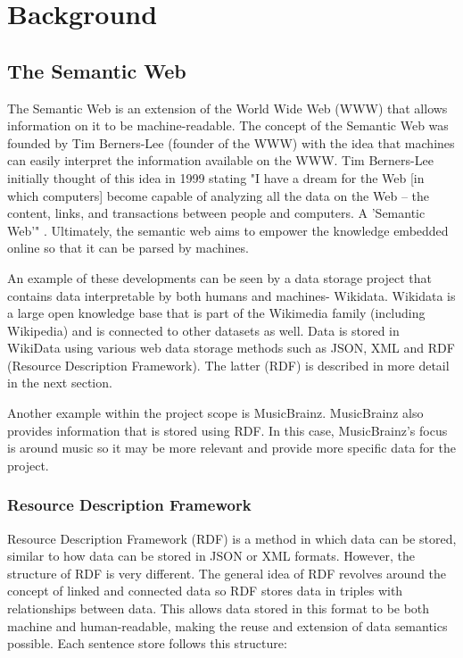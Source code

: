 \usetikzlibrary {arrows}
\usetikzlibrary {shapes.geometric}
\usetikzlibrary {patterns}

\chapter{Background}

\section{The Semantic Web}
\hspace*{0.5cm} The Semantic Web is an extension of the World Wide Web (WWW) that allows information on it to be machine-readable. \cite{semanticweb} The concept of the Semantic Web was founded by Tim Berners-Lee (founder of the WWW) with the idea that machines can easily interpret the information available on the WWW. Tim Berners-Lee initially thought of this idea in 1999 stating "I have a dream for the Web [in which computers] become capable of analyzing all the data on the Web – the content, links, and transactions between people and computers. A 'Semantic Web'" \cite{berners-TBLBook}. Ultimately, the semantic web aims to empower the knowledge embedded online so that it can be parsed by machines. \cite{semanticweb} 

An example of these developments can be seen by a data storage project that contains data interpretable by both humans and machines- Wikidata. Wikidata is a large open knowledge base that is part of the Wikimedia family (including Wikipedia) and is connected to other datasets as well. \cite{wikidata} Data is stored in WikiData using various web data storage methods such as JSON, XML and RDF (Resource Description Framework). The latter (RDF) is described in more detail in the next section.  

Another example within the project scope is MusicBrainz. MusicBrainz also provides information that is stored using RDF. \cite{musicbrainz} In this case, MusicBrainz's focus is around music so it may be more relevant and provide more specific data for the project.  

\subsection{Resource Description Framework}
\hspace*{0.5cm} Resource Description Framework (RDF) is a method in which data can be stored, similar to how data can be stored in JSON or XML formats. However, the structure of RDF is very different. The general idea of RDF revolves around the concept of linked and connected data so RDF stores data in triples with relationships between data. This allows data stored in this format to be both machine and human-readable, making the reuse and extension of data semantics possible\cite{rdf}. Each sentence store follows this structure: 

